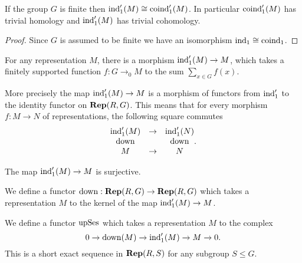 \begin{corollary}	\label{cor:ind₁' iso coind₁'}
	\leanok
	If the group $G$ is finite then $\mathrm{ind}_1'(M) \cong \mathrm{coind}_1'(M)$.
	In particular $\mathrm{coind}_1'(M)$ has trivial homology and $\mathrm{ind}_1'(M)$ has trivial cohomology.
\end{corollary}

\begin{proof}
	Since $G$ is assumed to be finite we have an isomorphism $\mathrm{ind}_1 \cong \mathrm{coind}_1$.
	\leanok
\end{proof}

\begin{definition} \label{def:ind₁'_π}
	For any representation $M$, there is a morphism $\mathrm{ind}_1'(M) \to M$,
	which takes a finitely supported function $f : G \to_0 M$ to the sum $\sum_{x \in G} f (x)$.
\end{definition}

\begin{lemma}	\label{lem:ind₁'_π}
	\leanok
	More precisely the map $\mathrm{ind}_1'(M) \to M$ is a morphism of functors from $\mathrm{ind}_1'$
	to the identity functor on $\mathbf{Rep}(R,G)$.
	This means that for every morphism $f : M \to N$ of representations, the following square
	commutes
	\[
		\begin{matrix}
			\mathrm{ind}_1'(M) & \to & \mathrm{ind}_1'(N) \\
			\mathrm{down} && \mathrm{down} \\
			M & \to &N
		\end{matrix}.
	\]
\end{lemma}

\begin{lemma}	\label{lem:ind₁'_π epi}
	\leanok
	The map $\mathrm{ind}_1'(M) \to M$ is surjective.
\end{lemma}


\begin{definition} \label{def:down}
	We define a functor $\mathrm{down} : \mathbf{Rep}(R,G) \to \mathbf{Rep}(R,G)$ which takes a representation
	$M$ to the kernel of the map $\mathrm{ind}_1'(M) \to M$.
\end{definition}

\begin{definition} \label{def:down ses}
	\leanok
	We define a functor $\mathrm{upSes}$ which takes a representation $M$ to the complex
	\[
		0 \to \mathrm{down}(M) \to \mathrm{ind}_1'(M) \to M \to 0.
	\]
	This is a short exact sequence in $\mathbf{Rep}(R,S)$ for any subgroup $S \le G$.
\end{definition}

